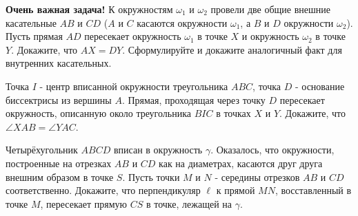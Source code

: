 \textbf{Очень важная задача!}
К окружностям $\omega_1$ и $\omega_2$ провели две общие внешние касательные $AB$ и $CD$ ($A$ и $C$ касаются окружности $\omega_1$, а $B$ и $D$ окружности $\omega_2$). Пусть прямая $AD$ пересекает окружность $\omega_1$ в точке $X$ и окружность $\omega_2$ в точке $Y$. Докажите, что $AX = DY$. Сформулируйте и докажите аналогичный факт для внутренних касательных.

Точка $I$ - центр вписанной окружности треугольника $A B C$, точка $D$ - основание биссектрисы из вершины $A$. Прямая, проходящая через точку $D$ пересекает окружность, описанную около треугольника $B I C$ в точках $X$ и $Y$. Докажите, что $\angle X A B=\angle Y A C$.

Четырёхугольник $A B C D$ вписан в окружность $\gamma$. Оказалось, что окружности, построенные на отрезках $A B$ и $C D$ как на диаметрах, касаются друг друга внешним образом в точке $S$. Пусть точки $M$ и $N$ - середины отрезков $A B$ и $C D$ соответственно. Докажите, что перпендикуляр $\ell$ к прямой $M N$, восставленный в точке $M$, пересекает прямую $C S$ в точке, лежащей на $\gamma$.